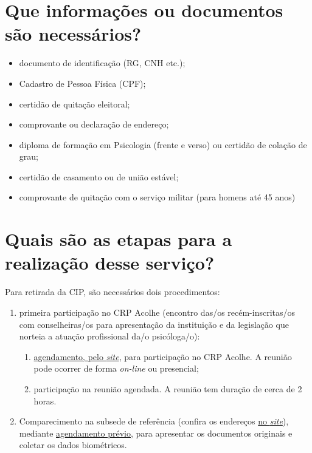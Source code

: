 \section{Que informações ou documentos são necessários?}

\begin{itemize}
  \item  documento de identificação (RG, CNH etc.);
  \item  Cadastro de Pessoa Física (CPF);
  \item  certidão de quitação eleitoral;
  \item  comprovante ou declaração de endereço;
  \item  diploma de formação em Psicologia (frente e verso) ou certidão de  colação de grau;
  \item  certidão de casamento ou de união estável;
  \item  comprovante de quitação com o serviço militar (para homens até 45  anos)
\end{itemize}

\section{Quais são as etapas para a realização desse serviço?}

Para retirada da CIP, são necessários dois procedimentos:

\begin{enumerate}
  \item  primeira participação no CRP Acolhe (encontro das/os  recém-inscritas/os com conselheiras/os para apresentação da  instituição e da legislação que norteia a atuação profissional da/o  psicóloga/o):

        \begin{enumerate}
          \item    \href{https://www.crpsp.org/inscrito/login}{agendamento, pelo    \emph{site}}, para participação no CRP Acolhe. A reunião pode    ocorrer de forma \emph{on-line} ou presencial;
          \item    participação na reunião agendada. A reunião tem duração de cerca de    2 horas.
        \end{enumerate}

  \item  Comparecimento na subsede de referência (confira os endereços  \href{https://www.crpsp.org/sede/index}{no \emph{site}}), mediante  \href{https://www.crpsp.org/agendamento}{agendamento prévio}, para  apresentar os documentos originais e coletar os dados  biométricos.
\end{enumerate}

